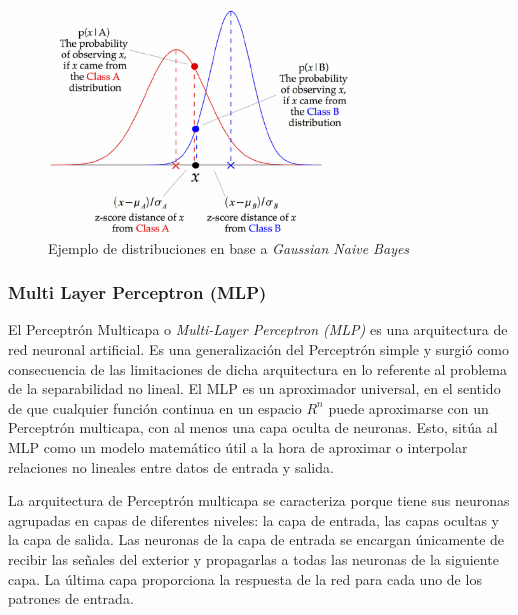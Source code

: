 \begin{figure}[H]
	\centering
	\includegraphics[width=8cm]{Figures/Background/GNB.png}
	\caption{Ejemplo de distribuciones en base a \textit{Gaussian Naive Bayes}}
	\label{GNB_BACKGROUND}
\end{figure}


\subsubsection*{Multi Layer Perceptron (MLP)}




El Perceptrón Multicapa o \textit{Multi-Layer Perceptron (MLP)} es una arquitectura de red neuronal artificial. Es una generalización del Perceptrón simple y surgió como consecuencia de las limitaciones de dicha arquitectura en lo referente al problema de la separabilidad no lineal. El MLP es un aproximador universal, en el sentido de que cualquier función continua en un espacio $R^n$ puede aproximarse con un Perceptrón multicapa, con al menos una capa oculta de neuronas. Esto, sitúa al MLP como un modelo matemático útil a la hora de aproximar o interpolar relaciones no lineales entre datos de entrada y salida.

La arquitectura de Perceptrón multicapa se caracteriza porque tiene sus neuronas agrupadas en capas de diferentes niveles: la capa de entrada, las capas ocultas y la capa de salida. Las neuronas de la capa de entrada se encargan únicamente de recibir las señales del exterior y propagarlas a todas las neuronas de la siguiente capa. La última capa proporciona la respuesta de la red para cada uno de los patrones de entrada.

